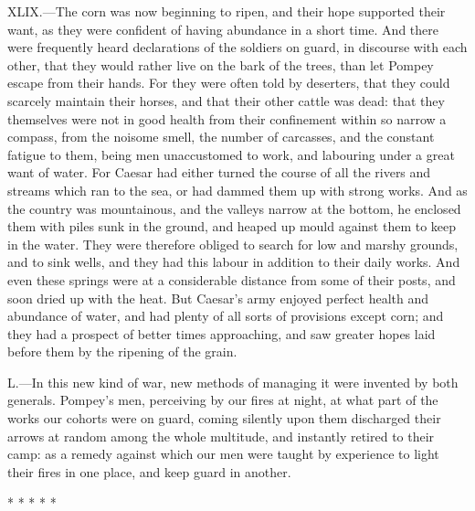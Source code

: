 XLIX.—The corn was now beginning to ripen, and their hope supported
their want, as they were confident of having abundance in a short time.
And there were frequently heard declarations of the soldiers on guard,
in discourse with each other, that they would rather live on the bark of
the trees, than let Pompey escape from their hands. For they were often
told by deserters, that they could scarcely maintain their horses, and
that their other cattle was dead: that they themselves were not in good
health from their confinement within so narrow a compass, from the
noisome smell, the number of carcasses, and the constant fatigue to
them, being men unaccustomed to work, and labouring under a great want
of water. For Caesar had either turned the course of all the rivers and
streams which ran to the sea, or had dammed them up with strong works.
And as the country was mountainous, and the valleys narrow at the
bottom, he enclosed them with piles sunk in the ground, and heaped up
mould against them to keep in the water. They were therefore obliged to
search for low and marshy grounds, and to sink wells, and they had this
labour in addition to their daily works. And even these springs were at
a considerable distance from some of their posts, and soon dried up with
the heat. But Caesar's army enjoyed perfect health and abundance of
water, and had plenty of all sorts of provisions except corn; and they
had a prospect of better times approaching, and saw greater hopes laid
before them by the ripening of the grain.

L.—In this new kind of war, new methods of managing it were invented by
both generals. Pompey's men, perceiving by our fires at night, at what
part of the works our cohorts were on guard, coming silently upon them
discharged their arrows at random among the whole multitude, and
instantly retired to their camp: as a remedy against which our men were
taught by experience to light their fires in one place, and keep guard
in another.

* * * * *

